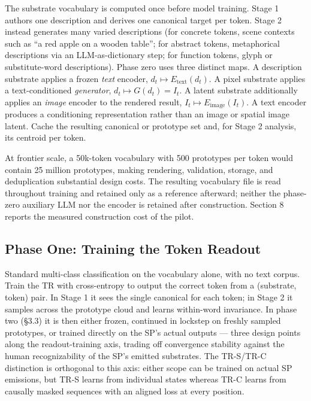 \documentclass[11pt,a4paper]{article}
\begin{document}
The substrate vocabulary is computed once before model training. Stage 1 authors one description and derives one canonical target per token. Stage 2 instead generates many varied descriptions (for concrete tokens, scene contexts such as ``a red apple on a wooden table''; for abstract tokens, metaphorical descriptions via an LLM-as-dictionary step; for function tokens, glyph or substitute-word descriptions). Phase zero uses three distinct maps. A description substrate applies a frozen \emph{text} encoder, $d_t \mapsto E_{\text{text}}(d_t)$. A pixel substrate applies a text-conditioned \emph{generator}, $d_t \mapsto G(d_t) = I_t$. A latent substrate additionally applies an \emph{image} encoder to the rendered result, $I_t \mapsto E_{\text{image}}(I_t)$. A text encoder produces a conditioning representation rather than an image or spatial image latent. Cache the resulting canonical or prototype set and, for Stage 2 analysis, its centroid per token.

At frontier scale, a 50k-token vocabulary with 500 prototypes per token would contain 25 million prototypes, making rendering, validation, storage, and deduplication substantial design costs. The resulting vocabulary file is read throughout training and retained only as a reference afterward; neither the phase-zero auxiliary LLM nor the encoder is retained after construction. Section 8 reports the measured construction cost of the pilot.

\subsection{Phase One: Training the Token Readout}

Standard multi-class classification on the vocabulary alone, with no text corpus. Train the TR with cross-entropy to output the correct token from a (substrate, token) pair. In Stage 1 it sees the single canonical for each token; in Stage 2 it samples across the prototype cloud and learns within-word invariance. In phase two (§3.3) it is then either frozen, continued in lockstep on freshly sampled prototypes, or trained directly on the SP's actual outputs --- three design points along the readout-training axis, trading off convergence stability against the human recognizability of the SP's emitted substrates. The TR-S/TR-C distinction is orthogonal to this axis: either scope can be trained on actual SP emissions, but TR-S learns from individual states whereas TR-C learns from causally masked sequences with an aligned loss at every position.
\end{document}
